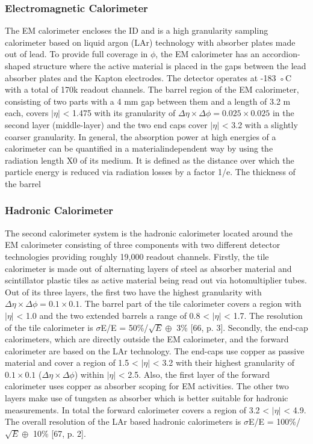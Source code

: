 \subsubsection*{Electromagnetic Calorimeter}

The EM calorimeter encloses the ID and is a high granularity sampling calorimeter based on liquid argon (LAr) technology with absorber plates made out of lead. To provide full coverage in $\phi$, the EM calorimeter has an accordion-shaped structure where the active material is placed in the gaps between the lead absorber plates and the Kapton electrodes. The detector operates at -183 ◦C with a total of 170k readout channels. The barrel region of the EM calorimeter, consisting of two parts with a 4 mm gap between them and a length of 3.2 m each, covers $|\eta|$ < 1.475 with its granularity of $\Delta\eta\times\Delta\phi= 0.025\times 0.025$ in the second layer (middle-layer) and the two end caps cover $|\eta|$ < 3.2 with a slightly coarser granularity. In general, the absorption power at high energies of a calorimeter can be quantified in a materialindependent way by using the radiation length X0 of its medium. It is defined as the distance over which the particle energy is reduced via radiation losses by a factor 1/e. The thickness of the barrel


\subsubsection*{Hadronic Calorimeter}

The second calorimeter system is the hadronic calorimeter located around the EM calorimeter consisting of three components with two different detector technologies providing roughly 19,000 readout channels.
Firstly, the tile calorimeter is made out of alternating layers of steel as absorber material and scintillator plastic tiles as active material being read out via hotomultiplier tubes. Out of its three layers, the first two have the highest granularity with $\Delta\eta\times\Delta\phi= 0.1\times 0.1$. The barrel part of the tile calorimeter covers a region with $|\eta|$ < 1.0 and the two extended barrels a range of 0.8 < $|\eta|$ < 1.7. The resolution of the tile calorimeter is $\sigma$E/E = 50\%/$\sqrt{E}\oplus$ 3\% [66, p. 3].
Secondly, the end-cap calorimeters, which are directly outside the EM calorimeter, and the forward calorimeter are based on the LAr technology. The end-caps use copper as passive material and cover a region of 1.5 < $|\eta|$ < 3.2 with their highest granularity of $0.1\times 0.1$ ($\Delta\eta\times\Delta\phi$) within $|\eta|$ < 2.5. Also, the first layer of the forward calorimeter uses copper as absorber scoping for EM activities. The other two layers make use of tungsten as absorber which is better suitable for hadronic measurements. In total the forward calorimeter covers a region of 3.2 < $|\eta|$ < 4.9. The overall resolution of the LAr based hadronic calorimeters is $\sigma$E/E = 100\%/$\sqrt{E}\oplus$ 10\% [67, p. 2].

